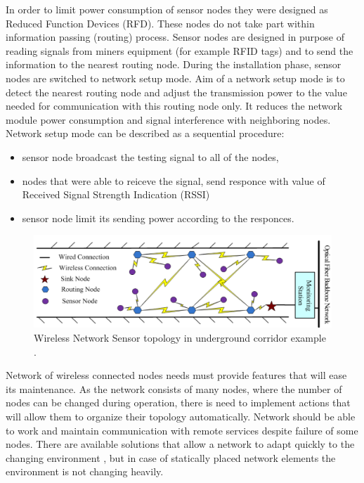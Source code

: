 \documentclass[../main.tex]{subfiles}
\begin{document}
In order to limit power consumption of sensor nodes they were designed as Reduced Function Devices (RFD). These nodes do not take part within information passing (routing) process. Sensor nodes are designed in purpose of reading signals from miners equipment (for example RFID tags) and to send the information to the nearest routing node. During the installation phase, sensor nodes are switched to network setup mode.  Aim of a network setup mode is to detect the nearest routing node and adjust the transmission power to the value needed for communication with this routing node only. It reduces the network module power consumption and signal interference with neighboring nodes. Network setup mode can be described as a sequential procedure:
\begin{itemize}
	\item sensor node broadcast the testing signal to all of the nodes,
	\item nodes that were able to reiceve the signal, send responce with value of Received Signal Strength Indication (RSSI)
	\item sensor node limit its sending power according to the responces.
\end{itemize}

\begin{figure}[!htbp]
\includegraphics[width=\textwidth]{pictures/wsn_topology.png}
\centering
\caption{Wireless Network Sensor topology in underground corridor example \cite{WSN_monitoring}. }
\label{fig:wsn_topology}
\end{figure}

Network of wireless connected nodes needs must provide features that will ease its maintenance. As the network consists of many nodes, where the number of nodes can be changed during operation, there is need to implement actions that will allow them to organize their topology automatically. Network should be able to work and maintain communication with remote services despite failure of some nodes. There are available solutions that allow a network to adapt quickly to the changing environment \cite{WSN_collective}, but in case of statically placed network elements the environment is not changing heavily.
\end{document}
